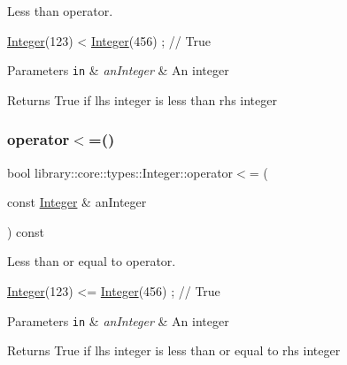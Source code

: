 Less than operator. 


\begin{DoxyCode}
\hyperlink{classlibrary_1_1core_1_1types_1_1_integer_a6483b1c4e13e5ed6af5e7a58347efead}{Integer}(123) < \hyperlink{classlibrary_1_1core_1_1types_1_1_integer_a6483b1c4e13e5ed6af5e7a58347efead}{Integer}(456) ; \textcolor{comment}{// True}
\end{DoxyCode}



\begin{DoxyParams}[1]{Parameters}
\mbox{\tt in}  & {\em an\+Integer} & An integer \\
\hline
\end{DoxyParams}
\begin{DoxyReturn}{Returns}
True if lhs integer is less than rhs integer 
\end{DoxyReturn}
\mbox{\label{classlibrary_1_1core_1_1types_1_1_integer_a57c084e8ca66e33675a706868b555962}} 
\subsubsection{\texorpdfstring{operator$<$=()}{operator<=()}}
{\footnotesize\ttfamily bool library\+::core\+::types\+::\+Integer\+::operator$<$= (\begin{DoxyParamCaption}\item[{const \hyperlink{classlibrary_1_1core_1_1types_1_1_integer}{Integer} \&}]{an\+Integer }\end{DoxyParamCaption}) const}



Less than or equal to operator. 


\begin{DoxyCode}
\hyperlink{classlibrary_1_1core_1_1types_1_1_integer_a6483b1c4e13e5ed6af5e7a58347efead}{Integer}(123) <= \hyperlink{classlibrary_1_1core_1_1types_1_1_integer_a6483b1c4e13e5ed6af5e7a58347efead}{Integer}(456) ; \textcolor{comment}{// True}
\end{DoxyCode}



\begin{DoxyParams}[1]{Parameters}
\mbox{\tt in}  & {\em an\+Integer} & An integer \\
\hline
\end{DoxyParams}
\begin{DoxyReturn}{Returns}
True if lhs integer is less than or equal to rhs integer 
\end{DoxyReturn}
\mbox{\label{classlibrary_1_1core_1_1types_1_1_integer_ab77cae94a9e6d4a405a555dd55763ea2}} 
